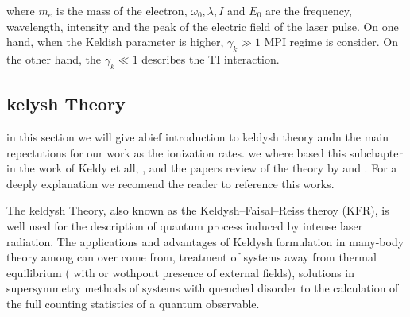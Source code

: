 where $m_{e}$ is the mass of the electron, $\omega_{0}, \lambda, I$ and $E_{0}$ are the frequency, wavelength, intensity and the peak of the electric field of the laser pulse. On one hand, when the Keldish parameter is higher, $\gamma_{k} \gg 1$ MPI regime is consider. On the other hand, the $\gamma_{k} \ll 1$ describes the TI interaction.

\subsection{kelysh Theory}

in this section we will give abief introduction to keldysh theory andn the main repectutions for our work as the ionization rates. we where based this subchapter in the work of Keldy et all, \cite{keldysh_ionization_1965}, and the papers review of the theory by \cite{popruzhenko_keldysh_2014} and \cite{karnakov_strong_2009}. For a deeply explanation we recomend the reader to reference this works.

The keldysh Theory, also known as the Keldysh–Faisal–Reiss theroy (KFR),  is well used for the description of quantum process induced by intense laser radiation. The applications and advantages of Keldysh formulation in many-body theory among  can over come from, treatment of systems away from thermal equilibrium ( with or wothpout presence of external fields), solutions in  supersymmetry methods of systems with quenched disorder to the  calculation of the full counting statistics of a quantum observable\cite{kamenev_introduction_nodate}.

